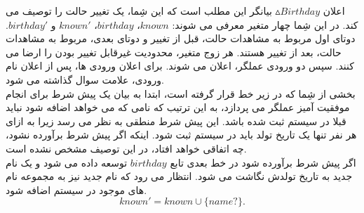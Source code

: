 اعلان 
$\vartriangle \mathit{Birthday}$
بیانگر این مطلب است که این شِما، یک تغییر حالت را توصیف می کند. در این شِما چهار متغیر معرفی می شوند: 
$\mathit{known}$،
$\mathit{birthday}$،
$\mathit{known'}$ و
$\mathit{birthday'}$.
دوتای اول مربوط به مشاهدات حالت، قبل از تغییر و دوتای بعدی، مربوط به مشاهدات حالت، بعد از تغییر هستند.
هر زوج متغیر، محدودیت غیرقابل تغییر بودن را ارضا می کنند.
سپس دو ورودی عملگر، اعلان می شوند. برای اعلان ورودی ها، پس از اعلان نام ورودی، علامت سوال گذاشته می شود.
\\
بخشی از شِما که در زیر خط قرار گرفته است، ابتدا به بیان یک پیش شرط برای انجام موفقیت آمیز عملگر می پردازد، به این ترتیب که نامی که می خواهد اضافه شود نباید قبلا در سیستم ثبت شده باشد. این پیش شرط منطقی به نظر می رسد زیرا به ازای هر نفر تنها یک تاریخ تولد باید در سیستم ثبت شود. اینکه اگر پیش شرط برآورده نشود، چه اتفاقی خواهد افتاد، در این توصیف مشخص نشده است.
\\ اگر پیش شرط برآورده شود در خط بعدی تابع 
$\mathit{birthday}$
توسعه داده می شود و یک نام جدید به تاریخ تولدش نگاشت می شود.
انتظار می رود که نام جدید نیز به مجموعه نام های موجود در سیستم اضافه شود.
\[
\mathit{known'}=\mathit{known} \cup \{ \mathit{name?}\}.
\]

